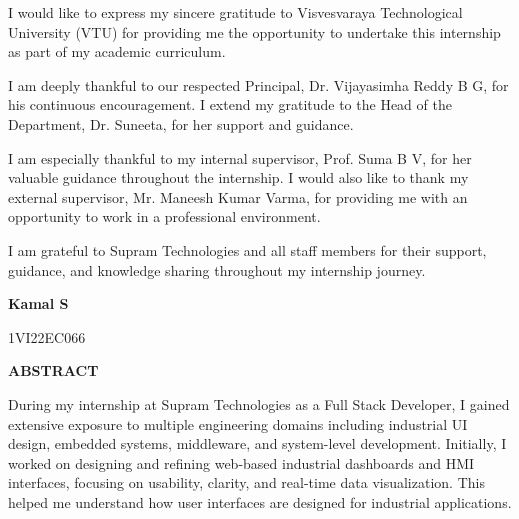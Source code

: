 \documentclass[12pt,a4paper]{report}
\begin{document}
\vspace{0.5cm}
\setlength{\parindent}{1.5em}
\begin{onehalfspacing}

I would like to express my sincere gratitude to Visvesvaraya Technological University (VTU) for providing me the opportunity to undertake this internship as part of my academic curriculum.


I am deeply thankful to our respected Principal, Dr. Vijayasimha Reddy B G, for his continuous encouragement. I extend my gratitude to the Head of the Department, Dr. Suneeta, for her support and guidance.


I am especially thankful to my internal supervisor, Prof. Suma B V, for her valuable guidance throughout the internship. I would also like to thank my external supervisor, Mr. Maneesh Kumar Varma, for providing me with an opportunity to work in a professional environment.


I am grateful to Supram Technologies and all staff members for their support, guidance, and knowledge sharing throughout my internship journey.

\end{onehalfspacing}

\vspace{1cm}
\begin{flushright}
\textbf{Kamal S}\par
1VI22EC066\par
\end{flushright}

\newpage
\begin{center}
{\LARGE \textbf{ABSTRACT}\par}
\end{center}

\vspace{0.5cm}
\setlength{\parindent}{1.5em}

During my internship at Supram Technologies as a Full Stack Developer, I gained extensive exposure to multiple engineering domains including industrial UI design, embedded systems, middleware, and system-level development. Initially, I worked on designing and refining web-based industrial dashboards and HMI interfaces, focusing on usability, clarity, and real-time data visualization. This helped me understand how user interfaces are designed for industrial applications.
\end{document}
